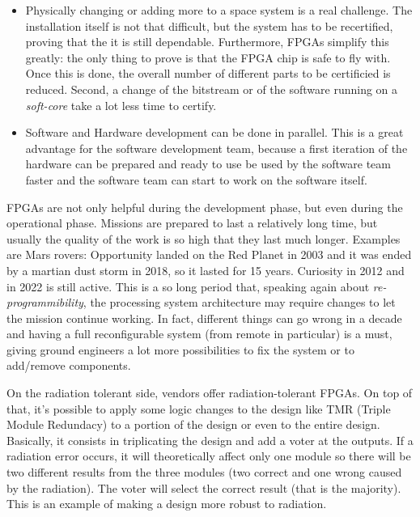 \begin{itemize}
    \item Physically changing or adding more to a space system is a real challenge. The installation itself is not that difficult, but the system has to be recertified, proving that the it is still dependable. Furthermore, FPGAs simplify this greatly: the only thing to prove is that the FPGA chip is safe to fly with. Once this is done, the overall number of different parts to be certificied is reduced. Second, a change of the bitstream or of the software running on a \textit{soft-core} take a lot less time to certify.
    \item Software and Hardware development can be done in parallel. This is a great advantage for the software development team, because a first iteration of the hardware can be prepared and ready to use be used by the software team faster and the software team can start to work on the software itself.
\end{itemize}

FPGAs are not only helpful during the development phase, but even during the operational phase. Missions are prepared to last a relatively long time, but usually the quality of the work is so high that they last much longer. Examples are Mars rovers: Opportunity landed on the Red Planet in 2003 and it was ended by a martian dust storm in 2018, so it lasted for 15 years. Curiosity in 2012 and in 2022 is still active. This is a so long period that, speaking again about \textit{re-programmibility}, the processing system architecture may require changes to let the mission continue working. In fact, different things can go wrong in a decade and having a full reconfigurable system (from remote in particular) is a must, giving ground engineers a lot more possibilities to fix the system or to add/remove components. \bigskip

On the radiation tolerant side, vendors offer radiation-tolerant FPGAs. On top of that, it's possible to apply some logic changes to the design like TMR (Triple Module Redundacy) to a portion of the design or even to the entire design. Basically, it consists in triplicating the design and add a voter at the outputs. If a radiation error occurs, it will theoretically affect only one module so there will be two different results from the three modules (two correct and one wrong caused by the radiation). The voter will select the correct result (that is the majority). This is an example of making a design more robust to radiation.\bigskip

